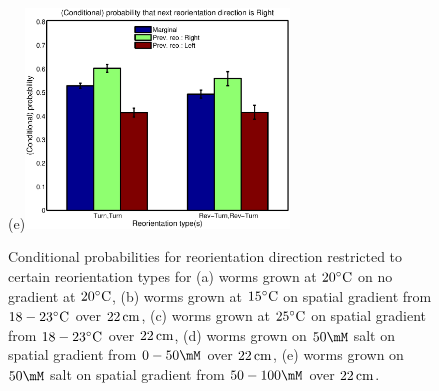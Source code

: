 \documentclass[12pt]{article}
\begin{document}
\begin{figure}
\begin{center}
  (e)\includegraphics[width=7cm]{cond_dir_vs_type_(saltphobic).eps}
\end{center}
  \caption[Conditional probabilities for reorientation direction restricted to certain reorientation types.]{Conditional probabilities for reorientation direction restricted to certain reorientation types for
  (a) worms grown at $20^\circ\mathrm{C}$ on no gradient at $20^\circ\mathrm{C}$,
  (b) worms grown at $15^\circ\mathrm{C}$ on spatial gradient from $18-23^\circ\mathrm{C}$ over $22\,\mathrm{cm}$,
  (c) worms grown at $25^\circ\mathrm{C}$ on spatial gradient from $18-23^\circ\mathrm{C}$ over $22\,\mathrm{cm}$,
  (d) worms grown on $50\mM$ salt on spatial gradient from $0-50\mM$ over $22\,\mathrm{cm}$,
  (e) worms grown on $50\mM$ salt on spatial gradient from $50-100\mM$ over $22\,\mathrm{cm}$.}\label{fig:dirvstype}
\end{figure}
\end{document}
